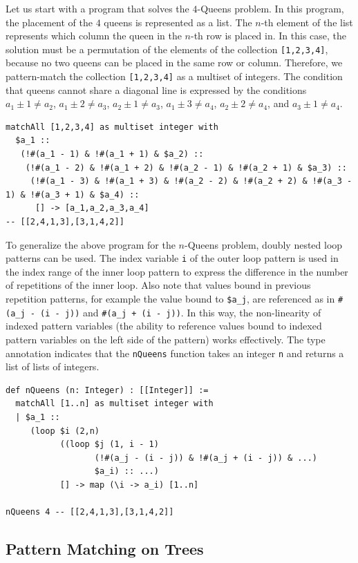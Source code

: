 Let us start with a program that solves the $4$-Queens problem.
In this program, the placement of the $4$ queens is represented as a list.
The $n$-th element of the list represents which column the queen in the $n$-th row is placed in.
In this case, the solution must be a permutation of the elements of the collection \lstinline|[1,2,3,4]|,
because no two queens can be placed in the same row or column.
Therefore, we pattern-match the collection \lstinline|[1,2,3,4]| as a multiset of integers.
The condition that queens cannot share a diagonal line is expressed by the conditions $a_1 \pm 1 \neq a_2$, $a_1 \pm 2 \neq a_3$, $a_2 \pm 1 \neq a_3$, $a_1 \pm 3 \neq a_4$, $a_2 \pm 2 \neq a_4$, and $a_3 \pm 1 \neq a_4$.
\begin{lstlisting}[language=egison,numbers=none]
matchAll [1,2,3,4] as multiset integer with
  $a_1 ::
   (!#(a_1 - 1) & !#(a_1 + 1) & $a_2) ::
    (!#(a_1 - 2) & !#(a_1 + 2) & !#(a_2 - 1) & !#(a_2 + 1) & $a_3) ::
     (!#(a_1 - 3) & !#(a_1 + 3) & !#(a_2 - 2) & !#(a_2 + 2) & !#(a_3 - 1) & !#(a_3 + 1) & $a_4) ::
      [] -> [a_1,a_2,a_3,a_4]
-- [[2,4,1,3],[3,1,4,2]]
\end{lstlisting}
To generalize the above program for the $n$-Queens problem, doubly nested loop patterns can be used.
The index variable \lstinline|i| of the outer loop pattern is used in the index range of the inner loop pattern to express the difference in the number of repetitions of the inner loop.
Also note that values bound in previous repetition patterns, for example the value bound to \lstinline|$a_j|, are referenced as in \lstinline|#(a_j - (i - j))| and \lstinline|#(a_j + (i - j))|.
In this way, the non-linearity of indexed pattern variables (the ability to reference values bound to indexed pattern variables on the left side of the pattern) works effectively.
The type annotation indicates that the \lstinline{nQueens} function takes an integer \lstinline{n} and returns a list of lists of integers.
\begin{lstlisting}[language=egison,numbers=none]
def nQueens (n: Integer) : [[Integer]] :=
  matchAll [1..n] as multiset integer with
  | $a_1 ::
     (loop $i (2,n)
           ((loop $j (1, i - 1)
                  (!#(a_j - (i - j)) & !#(a_j + (i - j)) & ...)
                  $a_i) :: ...)
           [] -> map (\i -> a_i) [1..n]

nQueens 4 -- [[2,4,1,3],[3,1,4,2]]
\end{lstlisting}

\subsection{Pattern Matching on Trees}\label{pmo-tree}

